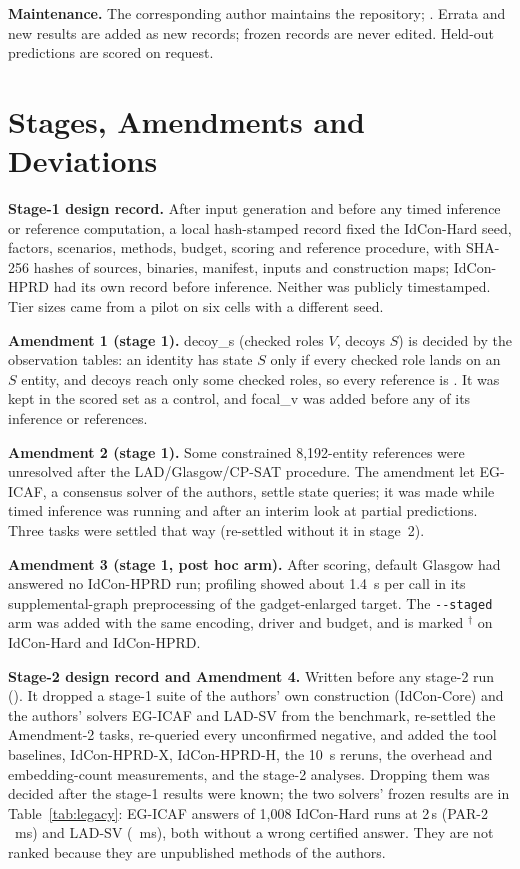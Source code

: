 \textbf{Maintenance.} The corresponding author maintains the repository; \archiveSentence. Errata and new results are added as new records; frozen records are never edited. Held-out predictions are scored on request.

\section{Stages, Amendments and Deviations}
\label{app:registration}
\textbf{Stage-1 design record.} After input generation and before any timed inference or reference computation, a local hash-stamped record fixed the IdCon-Hard seed, factors, scenarios, methods, budget, scoring and reference procedure, with SHA-256 hashes of sources, binaries, manifest, inputs and construction maps; IdCon-HPRD had its own record before inference. Neither was publicly timestamped. Tier sizes came from a pilot on six cells with a different seed.

\textbf{Amendment 1 (stage 1).} \textsf{decoy\_s} (checked roles $V$, decoys $S$) is decided by the observation tables: an identity has state $S$ only if every checked role lands on an $S$ entity, and decoys reach only some checked roles, so every reference is \Vio. It was kept in the scored set as a control, and \textsf{focal\_v} was added before any of its inference or references.

\textbf{Amendment 2 (stage 1).} Some constrained 8,192-entity references were unresolved after the LAD/Glasgow/CP-SAT procedure. The amendment let EG-ICAF, a consensus solver of the authors, settle state queries; it was made while timed inference was running and after an interim look at partial predictions. Three tasks were settled that way (re-settled without it in stage~2).

\textbf{Amendment 3 (stage 1, post hoc arm).} After scoring, default Glasgow had answered no IdCon-HPRD run; profiling showed about 1.4~s per call in its supplemental-graph preprocessing of the gadget-enlarged target. The \texttt{-{}-staged} arm was added with the same encoding, driver and budget, and is marked $^\dagger$ on IdCon-Hard and IdCon-HPRD.

\textbf{Stage-2 design record and Amendment 4.} Written before any stage-2 run (). It dropped a stage-1 suite of the authors' own construction (IdCon-Core) and the authors' solvers EG-ICAF and LAD-SV from the benchmark, re-settled the Amendment-2 tasks, re-queried every unconfirmed negative, and added the tool baselines, IdCon-HPRD-X, IdCon-HPRD-H, the 10~s reruns, the overhead and embedding-count measurements, and the stage-2 analyses. Dropping them was decided after the stage-1 results were known; the two solvers' frozen results are in Table~\ref{tab:legacy}: EG-ICAF answers \legEgCorrect{} of 1,008 IdCon-Hard runs at 2\,s (PAR-2 \legEgPar~ms) and LAD-SV \legSvCorrect{} (\legSvPar~ms), both without a wrong certified answer. They are not ranked because they are unpublished methods of the authors.

